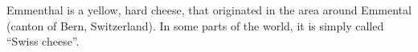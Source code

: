 Emmenthal is a yellow, hard cheese, that originated in the area around Emmental (canton of Bern, Switzerland).
In some parts of the world, it is simply called ``Swiss cheese''.
